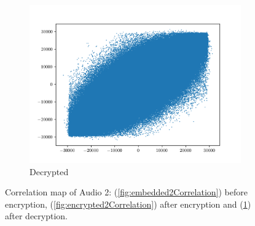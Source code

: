 \documentclass[a4paper]{cas-sc}
\begin{document}
\begin{figure}[pos=h]
\begin{subfigure}[h]{0.3\textwidth}
\begin{center}
        \end{center}
    \end{subfigure}
    \begin{subfigure}[h]{0.3\textwidth}
        \begin{center}
            \includegraphics[width=\textwidth]{decrypted2Correlation.png}
            \caption{Decrypted}
            \label{fig:decrypted2Correlation}
        \end{center}
    \end{subfigure}
    \caption{Correlation map of Audio 2: (\ref{fig:embedded2Correlation}) before encryption, (\ref{fig:encrypted2Correlation}) after encryption and (\ref{fig:decrypted2Correlation}) after decryption.}
    \label{fig:audio2Correlation}
\end{figure}
\end{document}

